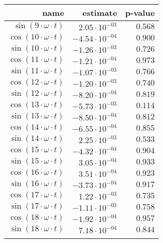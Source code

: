 \begin{tabular}{r|rr}
\hline
 name                            & estimate               & p-value   \\
\hline
 $\sin(9 \cdot \omega \cdot t)$  & $2.05 \cdot 10^{-03}$  & $0.568$   \\
 $\cos(10 \cdot \omega \cdot t)$ & $-4.54 \cdot 10^{-04}$ & $0.900$   \\
 $\sin(10 \cdot \omega \cdot t)$ & $-1.26 \cdot 10^{-03}$ & $0.726$   \\
 $\cos(11 \cdot \omega \cdot t)$ & $-1.21 \cdot 10^{-04}$ & $0.973$   \\
 $\sin(11 \cdot \omega \cdot t)$ & $-1.07 \cdot 10^{-03}$ & $0.766$   \\
 $\cos(12 \cdot \omega \cdot t)$ & $-1.20 \cdot 10^{-03}$ & $0.740$   \\
 $\sin(12 \cdot \omega \cdot t)$ & $-8.20 \cdot 10^{-04}$ & $0.819$   \\
 $\cos(13 \cdot \omega \cdot t)$ & $-5.73 \cdot 10^{-03}$ & $0.114$   \\
 $\sin(13 \cdot \omega \cdot t)$ & $-8.50 \cdot 10^{-04}$ & $0.812$   \\
 $\cos(14 \cdot \omega \cdot t)$ & $-6.55 \cdot 10^{-04}$ & $0.855$   \\
 $\sin(14 \cdot \omega \cdot t)$ & $2.25 \cdot 10^{-03}$  & $0.533$   \\
 $\cos(15 \cdot \omega \cdot t)$ & $-4.32 \cdot 10^{-04}$ & $0.904$   \\
 $\sin(15 \cdot \omega \cdot t)$ & $3.05 \cdot 10^{-04}$  & $0.933$   \\
 $\cos(16 \cdot \omega \cdot t)$ & $3.51 \cdot 10^{-04}$  & $0.923$   \\
 $\sin(16 \cdot \omega \cdot t)$ & $-3.73 \cdot 10^{-04}$ & $0.917$   \\
 $\cos(17 \cdot \omega \cdot t)$ & $1.22 \cdot 10^{-03}$  & $0.735$   \\
 $\sin(17 \cdot \omega \cdot t)$ & $-1.11 \cdot 10^{-03}$ & $0.758$   \\
 $\cos(18 \cdot \omega \cdot t)$ & $-1.92 \cdot 10^{-04}$ & $0.957$   \\
 $\sin(18 \cdot \omega \cdot t)$ & $7.18 \cdot 10^{-04}$  & $0.844$   \\
                                 &                        &           \\
\hline
\end{tabular}